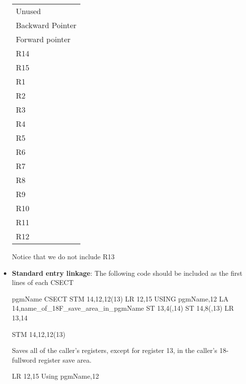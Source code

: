 \documentclass{report}
\begin{document}
\begin{itemize}
            \begin{center}
                \begin{tabular}{p{4cm}}
                    Unused \\
                    Backward Pointer \\
                    Forward pointer \\
                    R14 \\
                    R15 \\
                    R1\\
                    R2\\
                    R3\\
                    R4\\
                    R5\\
                    R6\\
                    R7\\
                    R8\\
                    R9\\
                    R10\\
                    R11\\
                    R12
                \end{tabular}
            \end{center}
            \bigbreak \noindent 
            Notice that we do not include R13
        \item \textbf{Standard entry linkage}: The following code should be included as the first lines of each CSECT
            \bigbreak \noindent 
            \begin{cppcode}
            pgmName    CSECT
                       STM   14,12,12(13)
                       LR    12,15
                       USING pgmName,12
                       LA    14,name_of_18F_save_area_in_pgmName
                       ST    13,4(,14)
                       ST    14,8(,13)
                       LR    13,14
            \end{cppcode}
            \bigbreak \noindent 
            \begin{cppcode}
            STM   14,12,12(13) 
            \end{cppcode}
            \bigbreak \noindent 
            Saves all of the caller's registers, except for register 13, in the caller's 18-fullword register save area.
            \bigbreak \noindent 
            \begin{cppcode}
            LR    12,15
            Using pgmName,12

\end{cppcode}
\end{itemize}
\end{document}

